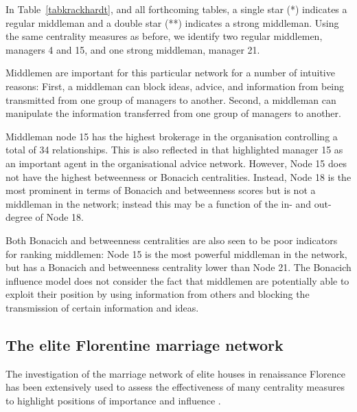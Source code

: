\documentclass[11pt,fleqn]{article}
\begin{document}
In Table~\ref{tabkrackhardt}, and all forthcoming tables, a single star (*) indicates a regular middleman and a double star (**) indicates a strong middleman. Using the same centrality measures as before, we identify two regular middlemen, managers 4 and 15, and one strong middleman, manager 21. 

Middlemen are important for this particular network for a number of intuitive reasons: First, a middleman can block ideas, advice, and information from being transmitted from one group of managers to another. Second, a middleman can manipulate the information transferred from one group of managers to another.

Middleman node 15 has the highest brokerage in the organisation controlling a total of 34 relationships. This is also reflected in that \citet{Krackhardt1987} highlighted manager 15 as an important agent in the organisational advice network. However, Node 15 does not have the highest betweenness or Bonacich centralities. Instead, Node 18 is the most prominent in terms of Bonacich and betweenness scores but is not a middleman in the network; instead this may be a function of the in- and out-degree of Node 18.

Both Bonacich and betweenness centralities are also seen to be poor indicators for ranking middlemen: Node 15 is the most powerful middleman in the network, but has a Bonacich and betweenness centrality lower than Node 21. The Bonacich influence model does not consider the fact that middlemen are potentially able to exploit their position by using information from others and blocking the transmission of certain information and ideas.

\subsection{The elite Florentine marriage network}

The investigation of the marriage network of elite houses in renaissance Florence has been extensively used to assess the effectiveness of many centrality measures to highlight positions of importance and influence \citep{Newman2003betweenness}.
\end{document}

